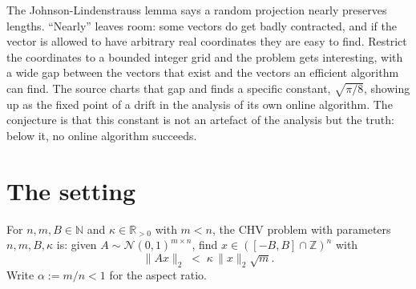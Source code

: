 \documentclass{conjura-conjecture}
\newcommand{\Z}{\mathbb{Z}}
\newcommand{\R}{\mathbb{R}}
\newcommand{\CHV}{\mathrm{CHV}}
\begin{document}

\vspace{0.4em}

\begin{informalconjecture}
The Johnson-Lindenstrauss lemma says a random projection nearly preserves
lengths. ``Nearly'' leaves room: some vectors do get badly contracted,
and if the vector is allowed to have arbitrary real coordinates they are
easy to find. Restrict the coordinates to a bounded integer grid and the
problem gets interesting, with a wide gap between the vectors that exist
and the vectors an efficient algorithm can find. The source charts that
gap and finds a specific constant, $\sqrt{\pi/8}$, showing up as the
fixed point of a drift in the analysis of its own online algorithm. The
conjecture is that this constant is not an artefact of the analysis but
the truth: below it, no online algorithm succeeds.
\end{informalconjecture}

\section{The setting}\label{sec:setting}

\begin{definition}\label{def:chv}
For $n, m, B \in \mathbb{N}$ and $\kappa \in \R_{>0}$ with $m < n$, the
$\CHV$ problem with parameters $n, m, B, \kappa$ is: given $A \sim
\mathcal{N}(0,1)^{m \times n}$, find $x \in ([-B,B] \cap \Z)^{n}$ with
\[
  \|Ax\|_{2} \;<\; \kappa\,\|x\|_{2}\sqrt{m}.
\]
Write $\alpha := m/n < 1$ for the aspect ratio.
\end{definition}
\end{document}
